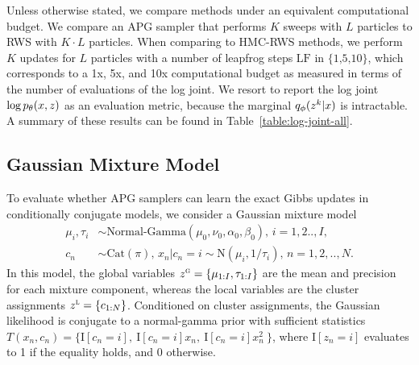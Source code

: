 \documentclass{article}
\theoremstyle{definition}
\begin{document}
Unless otherwise stated, we compare methods under an equivalent computational budget. We compare an APG sampler that performs $K$ sweeps with $L$ particles to RWS with $K \cdot L$ particles. When comparing to HMC-RWS methods, we perform $K$ updates for $L$ particles with a number of leapfrog steps $\text{LF in \{1,5,10\}}$, which corresponds to a 1x, 5x, and 10x computational budget as measured in terms of the number of evaluations of the log joint. We resort to report the log joint $\log p_\theta(x, z)$ as an evaluation metric, because the marginal $q_\phi(z^k | x)$ is intractable. A summary of these results can be found in Table~\ref{table:log-joint-all}. 


\subsection{Gaussian Mixture Model}
\label{sec:gmm}
\vspace{-0.5em}
To evaluate whether APG samplers can learn the exact Gibbs updates in conditionally conjugate models, we consider a Gaussian mixture model 
\begin{align*}
    \mu_i, \tau_i &\sim \text{Normal-Gamma}(\mu_0, \nu_0, \alpha_0, \beta_0)
    , \,
    i =1,2..,I, \\
    c_n &\sim \mathrm{Cat}(\pi), \,
    x_n | c_n\!=\!i \sim \text{N}(\mu_i, 1 / \tau_i)
    , \,
    n =1,2,..,N.
\end{align*}
In this model, the global variables $z^\textsc{g} = \{\mu_{1:I}, \tau_{1:I}\}$ are the mean and precision for each mixture component, whereas the local variables are the cluster assignments $z^\textsc{l} = \{c_{1:N}\}$. Conditioned on cluster assignments, the Gaussian likelihood  is conjugate to a normal-gamma prior with sufficient statistics $T(x_n, c_n)=\{\mathrm{I}[c_n \!=\! i], 
        ~\mathrm{I}[c_n \!=\! i] x_n, 
        ~\mathrm{I}[c_n \!=\! i] x_n^2 
        ~\}$,
where $\mathrm{I}[z_n \!=\! i]$ evaluates to 1 if the equality holds, and 0 otherwise.
\end{document}
